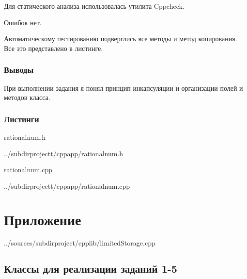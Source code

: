 \documentclass[12pt,a4paper]{report}
\begin{document}
Для статического анализа использовалась утилита Cppcheck.

\vspace{\baselineskip}

Ошибок нет.

\vspace{\baselineskip}
Автоматическому тестированию подверглись все методы и метод копирования.
Все это представлено в листинге.


\subsection{Выводы}

При выполнении задания я понял принцип инкапсуляции и организации полей и методов класса.

\subsection*{Листинги}
rationalnum.h

{../subdirprojectt/cppapp/rationalnum.h}

\vspace{\baselineskip}

rationalnum.cpp

{../subdirprojectt/cppapp/rationalnum.cpp}

\chapter {Приложение}../sources/subdirproject/cpplib/limitedStorage.cpp
\section{Классы для реализации заданий 1-5}
\end{document}
